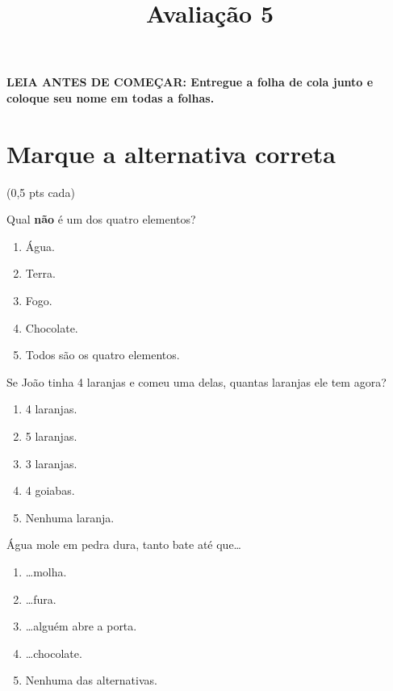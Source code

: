 \documentclass{provaifrs}
\title{Avaliação 5}
\begin{document}
\fontsize{10pt}{12pt}\selectfont
\maketitle

\textbf{LEIA ANTES DE COMEÇAR: Entregue a folha de cola junto e coloque seu nome em todas a folhas.}
\section{Marque a alternativa correta}
\centering(0,5 pts cada)
\begin{multicols}{2}
\begin{questoes}
  \item Qual \textbf{não} é um dos quatro elementos?
  \begin{enumerate}
    \item Água.
    \item Terra.
    \item Fogo.
    \item Chocolate.
    \item Todos são os quatro elementos.
  \end{enumerate}

  \item Se João tinha 4 laranjas e comeu uma delas, quantas laranjas ele tem agora?
  \begin{enumerate}
    \item 4 laranjas.
    \item 5 laranjas.
    \item 3 laranjas.
    \item 4 goiabas.
    \item Nenhuma laranja.
  \end{enumerate}

  \item Água mole em pedra dura, tanto bate até que\dots
  \begin{enumerate}
    \item \dots molha.
    \item \dots fura.
    \item \dots alguém abre a porta.
    \item \dots chocolate.
    \item Nenhuma das alternativas.
  \end{enumerate}


\end{questoes}
\end{multicols}
\end{document}
